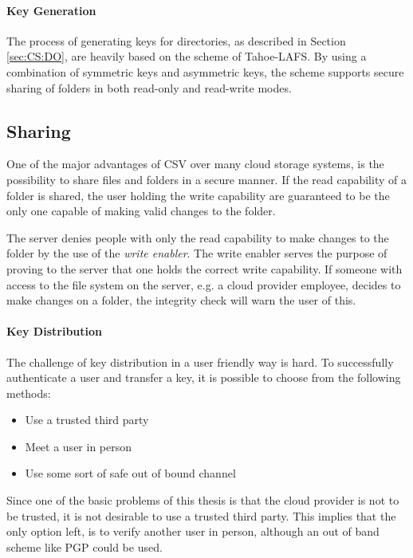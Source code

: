 \documentclass[pdftex,english,10pt,b5paper,twoside]{book}
\begin{document}
\paragraph{Key Generation} The process of generating keys for directories, as
described in Section \ref{sec:CS:DO}, are heavily based on the scheme of
Tahoe-\ac{LAFS}. By using a combination of symmetric keys and asymmetric keys,
the scheme supports secure sharing of folders in both read-only and read-write
modes.

\subsection{Sharing}

One of the major advantages of \ac{CSV} over many cloud storage systems, is the
possibility to share files and folders in a secure manner. If the read
capability of a folder is shared, the user holding the write capability are
guaranteed to be the only one capable of making valid changes to the folder.

The server denies people with only the read capability to make changes to the
folder by the use of the \emph{write enabler}. The write enabler serves the
purpose of proving to the server that one holds the correct write capability.
If someone with access to the file system on the server, e.g. a cloud
provider employee, decides to make changes on a folder, the integrity check
will warn the user of this.

\paragraph{Key Distribution}
\label{sec:DI:keydist}

The challenge of key distribution in a user friendly way is hard. To
successfully authenticate a user and transfer a key, it is possible to choose
from the following methods:

\begin{itemize}
 \item Use a trusted third party
 \item Meet a user in person
 \item Use some sort of safe out of bound channel
\end{itemize}

Since one of the basic problems of this thesis is that the cloud provider is
not to be trusted, it is not desirable to use a trusted third party. This
implies that the only option left, is to verify another user in person,
although an out of band scheme like \ac{PGP} could be used.
\end{document}
